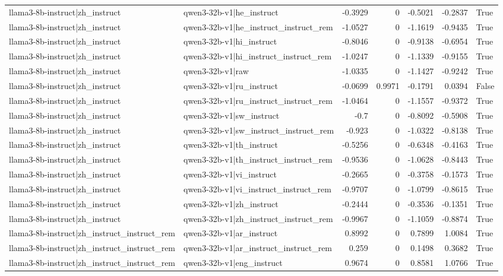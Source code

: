 \begin{table}
\begin{tabular}{l l r r r r l}
llama3-8b-instruct|zh_instruct & qwen3-32b-v1|he_instruct & -0.3929 & 0 & -0.5021 & -0.2837 & True \\
llama3-8b-instruct|zh_instruct & qwen3-32b-v1|he_instruct_instruct_rem & -1.0527 & 0 & -1.1619 & -0.9435 & True \\
llama3-8b-instruct|zh_instruct & qwen3-32b-v1|hi_instruct & -0.8046 & 0 & -0.9138 & -0.6954 & True \\
llama3-8b-instruct|zh_instruct & qwen3-32b-v1|hi_instruct_instruct_rem & -1.0247 & 0 & -1.1339 & -0.9155 & True \\
llama3-8b-instruct|zh_instruct & qwen3-32b-v1|raw & -1.0335 & 0 & -1.1427 & -0.9242 & True \\
llama3-8b-instruct|zh_instruct & qwen3-32b-v1|ru_instruct & -0.0699 & 0.9971 & -0.1791 & 0.0394 & False \\
llama3-8b-instruct|zh_instruct & qwen3-32b-v1|ru_instruct_instruct_rem & -1.0464 & 0 & -1.1557 & -0.9372 & True \\
llama3-8b-instruct|zh_instruct & qwen3-32b-v1|sw_instruct & -0.7 & 0 & -0.8092 & -0.5908 & True \\
llama3-8b-instruct|zh_instruct & qwen3-32b-v1|sw_instruct_instruct_rem & -0.923 & 0 & -1.0322 & -0.8138 & True \\
llama3-8b-instruct|zh_instruct & qwen3-32b-v1|th_instruct & -0.5256 & 0 & -0.6348 & -0.4163 & True \\
llama3-8b-instruct|zh_instruct & qwen3-32b-v1|th_instruct_instruct_rem & -0.9536 & 0 & -1.0628 & -0.8443 & True \\
llama3-8b-instruct|zh_instruct & qwen3-32b-v1|vi_instruct & -0.2665 & 0 & -0.3758 & -0.1573 & True \\
llama3-8b-instruct|zh_instruct & qwen3-32b-v1|vi_instruct_instruct_rem & -0.9707 & 0 & -1.0799 & -0.8615 & True \\
llama3-8b-instruct|zh_instruct & qwen3-32b-v1|zh_instruct & -0.2444 & 0 & -0.3536 & -0.1351 & True \\
llama3-8b-instruct|zh_instruct & qwen3-32b-v1|zh_instruct_instruct_rem & -0.9967 & 0 & -1.1059 & -0.8874 & True \\
llama3-8b-instruct|zh_instruct_instruct_rem & qwen3-32b-v1|ar_instruct & 0.8992 & 0 & 0.7899 & 1.0084 & True \\
llama3-8b-instruct|zh_instruct_instruct_rem & qwen3-32b-v1|ar_instruct_instruct_rem & 0.259 & 0 & 0.1498 & 0.3682 & True \\
llama3-8b-instruct|zh_instruct_instruct_rem & qwen3-32b-v1|eng_instruct & 0.9674 & 0 & 0.8581 & 1.0766 & True \\

\end{tabular}
\end{table}
